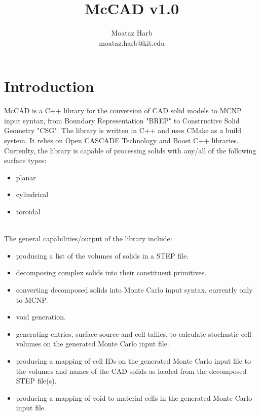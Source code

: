 \documentclass[12pt, a4paper, titlepage]{article}
\title{McCAD v1.0}
\author{Moataz Harb\\moataz.harb@kit.edu}
\affil{Karlsruhe Institute of Technology (KIT), Hermann-von-Helmholtz-Platz 1, 76344 Eggenstein-Leopoldshafen, Germany}
\begin{document}
\maketitle
\clearpage
\tableofcontents
\clearpage

\section{Introduction} \label{sec:Introduction}
McCAD is a C++ library for the conversion of CAD solid models to MCNP input syntax, from Boundary Representation "BREP" to Constructive Solid Geometry "CSG". The library is written in C++ and uses CMake as a build system. It relies on Open CASCADE Technology and Boost C++ libraries. Currenlty, the library is capable of processing solids with any/all of the following surface types:
\begin{itemize}
	\item planar
	\item cylindrical
	\item toroidal
\end{itemize}
\\
The general capabilities/output of the library include:
\begin{itemize}
	\item producing a list of the volumes of solids in a STEP file.
	\item decomposing complex solids into their constituent primitives.
	\item converting decomposed solids into Monte Carlo input syntax, currently only to MCNP.
	\item void generation.
	\item generating entries, surface source and cell tallies, to calculate stochastic cell volumes on the generated Monte Carlo input file.
	\item producing a mapping of cell IDs on the generated Monte Carlo input file to the volumes and names of the CAD solids as loaded from the decomposed STEP file(s).
	\item producing a mapping of void to material cells in the generated Monte Carlo input file.
\end{itemize}
\end{document}

